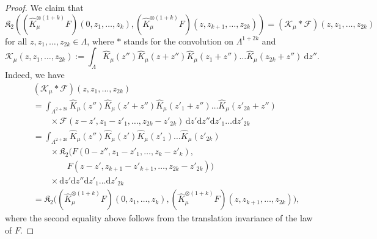 \documentclass{article}
\numberwithin{equation}{section}
\newcommand{\assign}{:=}
\newcommand{\mathd}{\mathrm{d}}
\theoremstyle{plain}
\theoremstyle{definition}
\begin{document}
\begin{proof}
  We claim that
  \[ \mathfrak{K}_2 ((\hat{K}^{\otimes (1 + k)}_{\mu} F) (0 , z_1, \ldots,
     z_k), (\hat{K}^{\otimes (1 + k)}_{\mu} F) (z , z_{k + 1}, \ldots, z_{2
     k})) = (\mathcal{K} _{\mu} \ast  \mathcal{F}) (z, z_1, \ldots, z_{2 k})
  \]
  for all $z, z_1, \ldots, z_{2 k} \in \Lambda$, where $\ast $ stands for the
  convolution on $\Lambda^{1 + 2 k}$ and
  \[ \mathcal{K} _{\mu} (z, z_1, \ldots, z_{2 k}) \assign \int_{\Lambda}
     \hat{K}_{\mu} (z'')  \hat{K} _{\mu} (z + z'')  \hat{K}_{\mu} (z_1 + z'')
     \ldots \hat{K}_{\mu} (z_{2 k} + z'') \: \mathd z'' . \]
  Indeed, we have
  \begin{align*}
 &\quad (\mathcal{K}_{\mu} \ast  \mathcal{F}) (z, z_1, \ldots, z_{2 k})\\
 &\quad = \int_{\Lambda^{2 + 2 k}} \hat{K}_{\mu} (z'')  \hat{K}_{\mu} (z' +
    z'')  \hat{K}_{\mu} (z'_1 + z'') \ldots \hat{K}_{\mu} (z'_{2 k} + z'')\\
 &\quad \qquad \times \mathcal{F} (z - z', z_1 - z'_1, \ldots, z_{2 k} -
    z'_{2 k})\,\mathd z' \mathd z'' \mathd z'_1 \ldots \mathd z'_{2 k}\\
 &\quad = \int_{\Lambda^{2 + 2 k}} \hat{K}_{\mu} (z'')  \hat{K}_{\mu} (z') 
    \hat{K}_{\mu} (z'_1) \ldots \hat{K}_{\mu} (z'_{2 k})\\
 &\quad \qquad \times \mathfrak{K}_2 \bigl(
    F (0 - z'' , z_1 - z'_1, \ldots, z_k - z'_k),\\
 &\quad \qquad \qquad
    F (z - z', z_{k + 1} - z'_{k + 1}, \ldots, z_{2 k} - z'_{2 k})\bigr)\\
 &\quad \qquad \times
    \mathd z' \mathd z'' \mathd z'_1 \ldots \mathd z'_{2 k}\\
 &\quad =\mathfrak{K}_2 \bigl(
    (\hat{K}^{\otimes (1 + k)}_{\mu} F) (0 , z_1, \ldots, z_k),
    (\hat{K}^{\otimes (1 + k)}_{\mu} F)
    (z , z_{k + 1}, \ldots, z_{2 k})\bigr),
  \end{align*}
  where the second equality above follows from the translation invariance of
  the law of $F$.
  

\end{proof}
\end{document}
